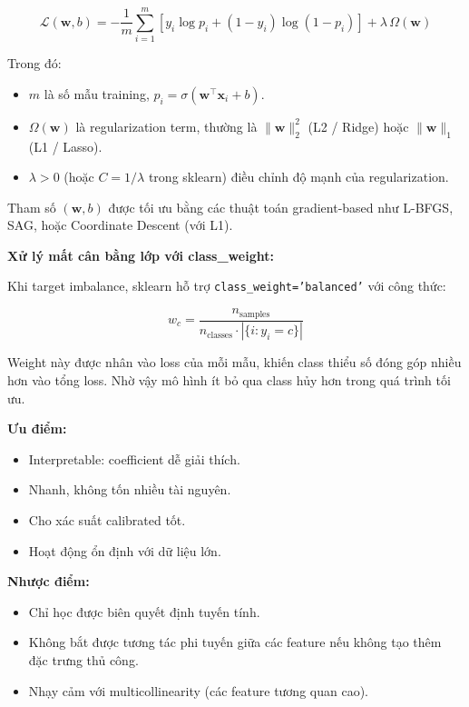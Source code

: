 \documentclass[12pt, a4paper]{article}
\begin{document}
\begin{equation}
\mathcal{L}(\mathbf{w}, b) = -\frac{1}{m} \sum_{i=1}^{m} \left[ y_i \log p_i + (1-y_i) \log(1-p_i) \right] + \lambda \, \Omega(\mathbf{w})
\end{equation}

Trong đó:
\begin{itemize}
    \item $m$ là số mẫu training, $p_i = \sigma(\mathbf{w}^\top \mathbf{x}_i + b)$.
    \item $\Omega(\mathbf{w})$ là regularization term, thường là $\|\mathbf{w}\|_2^2$ (L2 / Ridge) hoặc $\|\mathbf{w}\|_1$ (L1 / Lasso).
    \item $\lambda > 0$ (hoặc $C = 1/\lambda$ trong sklearn) điều chỉnh độ mạnh của regularization.
\end{itemize}

Tham số $(\mathbf{w}, b)$ được tối ưu bằng các thuật toán gradient-based như L-BFGS, SAG, hoặc Coordinate Descent (với L1).

\textbf{Xử lý mất cân bằng lớp với class\_weight:}

Khi target imbalance, sklearn hỗ trợ \texttt{class\_weight='balanced'} với công thức:

\begin{equation}
w_{c} = \frac{n_{\text{samples}}}{n_{\text{classes}} \cdot |\{i : y_i = c\}|}
\end{equation}

Weight này được nhân vào loss của mỗi mẫu, khiến class thiểu số đóng góp nhiều hơn vào tổng loss. Nhờ vậy mô hình ít bỏ qua class hủy hơn trong quá trình tối ưu.

\textbf{Ưu điểm:}
\begin{itemize}
    \item Interpretable: coefficient dễ giải thích.
    \item Nhanh, không tốn nhiều tài nguyên.
    \item Cho xác suất calibrated tốt.
    \item Hoạt động ổn định với dữ liệu lớn.
\end{itemize}

\textbf{Nhược điểm:}
\begin{itemize}
    \item Chỉ học được biên quyết định tuyến tính.
    \item Không bắt được tương tác phi tuyến giữa các feature nếu không tạo thêm đặc trưng thủ công.
    \item Nhạy cảm với multicollinearity (các feature tương quan cao).
\end{itemize}
\end{document}
